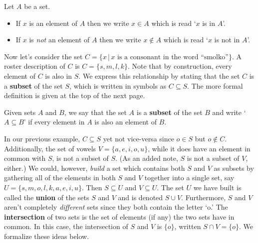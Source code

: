 \documentclass{ximera}
\begin{document}
\colorbox{ResultColor}{\bbm

\begin{definition} \label{notationforsetinclusion}  Let $A$ be a set.

\begin{itemize}

\item If $x$ is an element of $A$ then we write $x \in A$\index{$\in$} which is read `$x$ is in $A$'.

\item If $x$ is \emph{not} an element of $A$ then we write $x \notin A$\index{$\notin$} which is read `$x$ is not in $A$'.

\end{itemize}

\end{definition}

\ebm}

\medskip

Now let's consider the set $C =  \{ x \, | \, \mbox{$x$ is a consonant in the word ``smolko''}\}$.  A roster description of $C$ is  $C = \{ s, m, l, k\}$.  Note that by construction, every element of $C$ is also in $S$.  We express this relationship by stating that the set $C$ is a \textbf{subset} of the set $S$, which is written in symbols as $C \subseteq S$.  The more formal definition is given at the top of the next page.

\medskip

\colorbox{ResultColor}{\bbm

\begin{definition} \label{subsetdef}

Given sets $A$ and $B$, we say that the set $A$ is a \textbf{subset} of the set $B$ and write `$A \subseteq B$' if every element in $A$ is also an element of $B$.  

\end{definition}

\ebm}

\medskip

In our previous example, $C \subseteq S$ yet not vice-versa since $o \in S$ but $o \notin C$.  Additionally, the set of vowels $V = \{ a, e, i, o, u\}$, while it does have an element in common with $S$, is not a subset of $S$. (As an added note,  $S$ is not a subset of $V$, either.)  We could, however, \textit{build} a set which contains both $S$ and $V$ as subsets by gathering all of the elements in both $S$ and $V$ together into a single set, say $U = \{ s, m, o, l, k, a, e, i, u\}$.   Then $S \subseteq U$ and $V \subseteq U$.  The set $U$ we have built is called the \textbf{union} of the sets $S$ and $V$ and is denoted $S \cup V$.    Furthermore, $S$ and $V$ aren't completely \textit{different} sets since they both contain the letter `o.'  The \textbf{intersection} of two sets is the set of elements (if any) the two sets have in common. In this case, the intersection of $S$ and $V$ is $\{ o\}$, written $S \cap V = \{ o \}$.  We formalize these ideas below.
\end{document}
